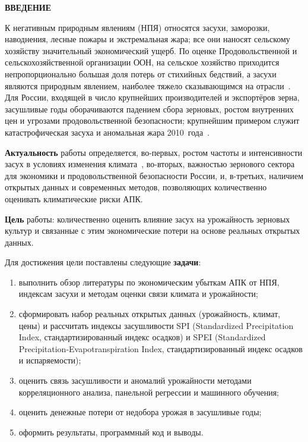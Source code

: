 \documentclass[14pt,a4paper]{extarticle}
\newcommand{\structhead}[1]{%
  \clearpage\phantomsection\addcontentsline{toc}{section}{#1}%
  \begin{center}\bfseries\large\MakeUppercase{#1}\end{center}\par\nopagebreak\medskip}
\begin{document}
\structhead{Введение}

К негативным природным явлениям (НПЯ) относятся засухи, заморозки, наводнения, лесные пожары и экстремальная жара; все они наносят сельскому хозяйству значительный экономический ущерб. По оценке Продовольственной и сельскохозяйственной организации ООН, на сельское хозяйство приходится непропорционально большая доля потерь от стихийных бедствий, а засухи являются природным явлением, наиболее тяжело сказывающимся на отрасли~\cite{fao2021}. Для России, входящей в число крупнейших производителей и экспортёров зерна, засушливые годы оборачиваются падением сбора зерновых, ростом внутренних цен и угрозами продовольственной безопасности; крупнейшим примером служит катастрофическая засуха и аномальная жара 2010~года~\cite{wegren2011,barriopedro2011}.

\textbf{Актуальность} работы определяется, во-первых, ростом частоты и интенсивности засух в условиях изменения климата~\cite{dai2013}, во-вторых, важностью зернового сектора для экономики и продовольственной безопасности России, и, в-третьих, наличием открытых данных и современных методов, позволяющих количественно оценивать климатические риски АПК.

\textbf{Цель} работы: количественно оценить влияние засух на урожайность зерновых культур и связанные с этим экономические потери на основе реальных открытых данных.

Для достижения цели поставлены следующие \textbf{задачи}:
\begin{enumerate}[leftmargin=*, topsep=2pt, itemsep=1pt]
\item выполнить обзор литературы по экономическим убыткам АПК от НПЯ, индексам засухи и методам оценки связи климата и урожайности;
\item сформировать набор реальных открытых данных (урожайность, климат, цены) и рассчитать индексы засушливости SPI (Standardized Precipitation Index, стандартизированный индекс осадков) и SPEI (Standardized Precipitation-Evapotranspiration Index, стандартизированный индекс осадков и испаряемости);
\item оценить связь засушливости и аномалий урожайности методами корреляционного анализа, панельной регрессии и машинного обучения;
\item оценить денежные потери от недобора урожая в засушливые годы;
\item оформить результаты, программный код и выводы.
\end{enumerate}
\end{document}
